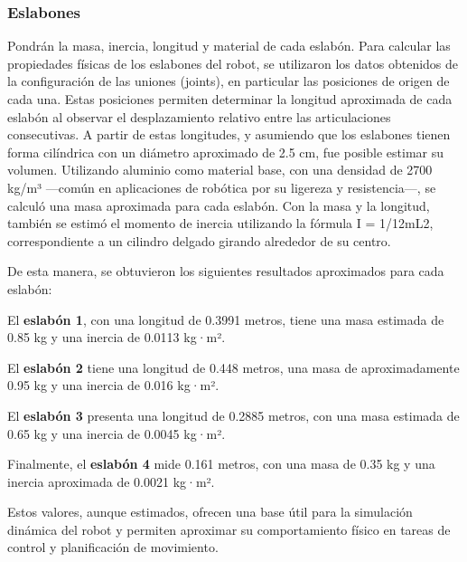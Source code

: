 \subsubsection{Eslabones} \label{subsubsec:eslabones}
Pondrán la masa, inercia, longitud y material de cada eslabón.
Para calcular las propiedades físicas de los eslabones del robot, se utilizaron los datos obtenidos de la configuración de las uniones (joints), en particular las posiciones de origen de cada una. Estas posiciones permiten determinar la longitud aproximada de cada eslabón al observar el desplazamiento relativo entre las articulaciones consecutivas. A partir de estas longitudes, y asumiendo que los eslabones tienen forma cilíndrica con un diámetro aproximado de 2.5 cm, fue posible estimar su volumen. Utilizando aluminio como material base, con una densidad de 2700 kg/m³ —común en aplicaciones de robótica por su ligereza y resistencia—, se calculó una masa aproximada para cada eslabón. Con la masa y la longitud, también se estimó el momento de inercia utilizando la fórmula I = 1/12mL2, correspondiente a un cilindro delgado girando alrededor de su centro.

De esta manera, se obtuvieron los siguientes resultados aproximados para cada eslabón:

El \textbf{eslabón 1}, con una longitud de 0.3991 metros, tiene una masa estimada de 0.85 kg y una inercia de 0.0113 kg·m².

El \textbf{eslabón 2} tiene una longitud de 0.448 metros, una masa de aproximadamente 0.95 kg y una inercia de 0.016 kg·m².

El \textbf{eslabón 3} presenta una longitud de 0.2885 metros, con una masa estimada de 0.65 kg y una inercia de 0.0045 kg·m².

Finalmente, el \textbf{eslabón 4} mide 0.161 metros, con una masa de 0.35 kg y una inercia aproximada de 0.0021 kg·m².

Estos valores, aunque estimados, ofrecen una base útil para la simulación dinámica del robot y permiten aproximar su comportamiento físico en tareas de control y planificación de movimiento.

